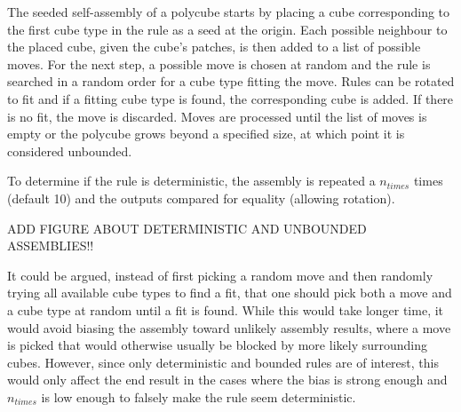 The seeded self-assembly of a polycube starts by placing a cube corresponding to the first cube type in the rule as a seed at the origin. Each possible neighbour to the placed cube, given the cube's patches, is then added to a list of possible moves. For the next step, a possible move is chosen at random and the rule is searched in a random order for a cube type fitting the move. Rules can be rotated to fit and if a fitting cube type is found, the corresponding cube is added. If there is no fit, the move is discarded. Moves are processed until the list of moves is empty or the polycube grows beyond a specified size, at which point it is considered unbounded.

To determine if the rule is deterministic, the assembly is repeated a \(n_{times}\) times (default 10) and the outputs compared for equality (allowing rotation).

ADD FIGURE ABOUT DETERMINISTIC AND UNBOUNDED ASSEMBLIES!!

It could be argued, instead of first picking a random move and then randomly trying all available cube types to find a fit, that one should pick both a move and a cube type at random until a fit is found. While this would take longer time, it would avoid biasing the assembly toward unlikely assembly results, where a move is picked that would otherwise usually be blocked by more likely surrounding cubes. However, since only deterministic and bounded rules are of interest, this would only affect the end result in the cases where the bias is strong enough and \(n_{times}\) is low enough to falsely make the rule seem deterministic.

